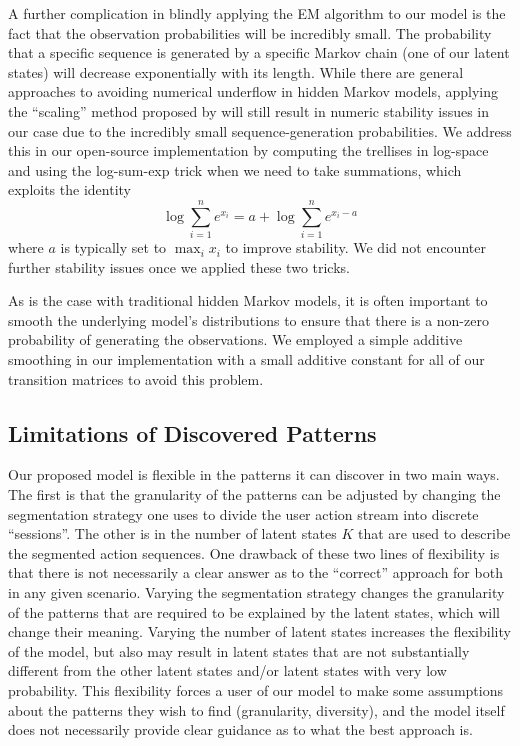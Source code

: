 A further complication in blindly applying the EM algorithm to our model is
the fact that the observation probabilities will be incredibly small. The
probability that a specific sequence is generated by a specific Markov
chain (one of our latent states) will decrease exponentially with its
length. While there are general approaches to avoiding numerical underflow
in hidden Markov models, applying the ``scaling'' method proposed by
\citet{Rabiner:1990:RSR} will still result in numeric stability issues in
our case due to the incredibly small sequence-generation probabilities. We
address this in our open-source implementation by computing the trellises
in log-space and using the log-sum-exp trick when we need to take
summations, which exploits the identity
\begin{equation}
    \log \sum_{i=1}^n e^{x_i} = a + \log \sum_{i=1}^n e^{x_i - a}
\end{equation}
where $a$ is typically set to $\max_i x_i$ to improve stability. We did not
encounter further stability issues once we applied these two tricks.

As is the case with traditional hidden Markov models, it is often important
to smooth the underlying model's distributions to ensure that there is a
non-zero probability of generating the observations. We employed a simple
additive smoothing in our implementation with a small additive constant for
all of our transition matrices to avoid this problem.

\subsection{Limitations of Discovered Patterns}

Our proposed model is flexible in the patterns it can discover in two main
ways. The first is that the granularity of the patterns can be adjusted by
changing the segmentation strategy one uses to divide the user action
stream into discrete ``sessions''. The other is in the number of latent
states $K$ that are used to describe the segmented action sequences. One
drawback of these two lines of flexibility is that there is not necessarily
a clear answer as to the ``correct'' approach for both in any given
scenario. Varying the segmentation strategy changes the granularity of the
patterns that are required to be explained by the latent states, which will
change their meaning. Varying the number of latent states increases the
flexibility of the model, but also may result in latent states that are not
substantially different from the other latent states and/or latent states
with very low probability. This flexibility forces a user of our model to
make some assumptions about the patterns they wish to find (granularity,
diversity), and the model itself does not necessarily provide clear
guidance as to what the best approach is.

